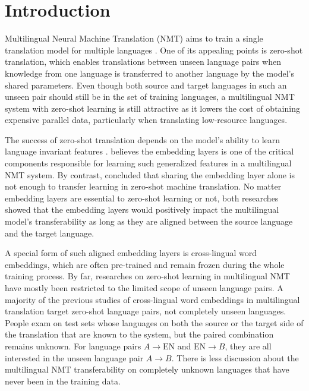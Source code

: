\documentclass[thesis,fonts=libertine]{cluu}
\begin{document}
\chapter{Introduction}

Multilingual Neural Machine Translation (NMT) aims to train a single translation model for multiple languages \parencite{Johnson:2016aa,aharoni-etal-2019-massively}. One of its appealing points is zero-shot translation, which enables translations between unseen language pairs when knowledge from one language is transferred to another language by the model's shared parameters. Even though both source and target languages in such an unseen pair should still be in the set of training languages, a multilingual NMT system with zero-shot learning is still attractive as it lowers the cost of obtaining expensive parallel data, particularly when translating low-resource languages.

The success of zero-shot translation depends on the model's ability to learn language invariant features \parencite{Arivazhagan:2019aa}. \textcite{Kim:2019aa} believes the embedding layers is one of the critical components responsible for learning such generalized features in a multilingual NMT system. By contrast, \textcite{aji-etal-2020-neural} concluded that sharing the embedding layer alone is not enough to transfer learning in zero-shot machine translation. No matter embedding layers are essential to zero-shot learning or not, both researches showed that the embedding layers would positively impact the multilingual model's transferability as long as they are aligned between the source language and the target language.

A special form of such aligned embedding layers is cross-lingual word embeddings, which are often pre-trained and remain frozen during the whole training process. By far, researches on zero-shot learning in multilingual NMT have mostly been restricted to the limited scope of unseen language pairs. A majority of the previous studies of cross-lingual word embeddings in multilingual translation target zero-shot language pairs, not completely unseen languages. People exam on test sets whose languages on both the source or the target side of the translation that are known to the system, but the paired combination remains unknown. For language pairs $A \rightarrow \text{EN}$ and $\text{EN} \rightarrow B$, they are all interested in the unseen language pair $A \rightarrow B$. There is less discussion about the multilingual NMT transferability on completely unknown languages that have never been in the training data.
\end{document}
